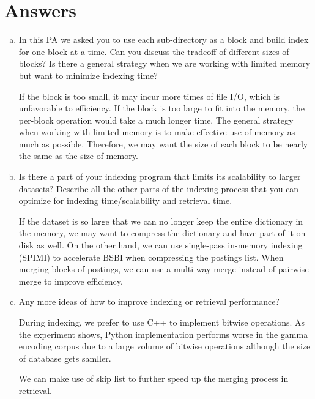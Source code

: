 \section{Answers}

\begin{enumerate}[(a)]
\item
In this PA we asked you to use each sub-directory as a block and build index
for one block at a time. Can you discuss the tradeoff of different sizes of
blocks? Is there a general strategy when we are working with limited memory
but want to minimize indexing time?

If the block is too small, it may incur more times of file I/O, which is unfavorable
 to efficiency. If the block is too large to fit into the memory, the per-block operation would take a much longer time. The general strategy when working with limited memory is to make effective use of memory as much as possible. Therefore, we may want the size of each block to be nearly the same as the size of memory.

\item Is there a part of your indexing program that limits its scalability to larger
datasets? Describe all the other parts of the indexing process that you can
optimize for indexing time/scalability and retrieval time.

If the dataset is so large that we can no longer keep the entire dictionary in the memory,
we may want to compress the dictionary and have part of it on disk as well. On the other hand, we can use single-pass in-memory indexing (SPIMI) to accelerate BSBI when compressing the postings list.
When merging blocks of postings, we can use a multi-way merge instead of pairwise merge to improve efficiency.

\item
Any more ideas of how to improve indexing or retrieval performance?

During indexing, we prefer to use C++ to implement bitwise operations. As the experiment shows, Python implementation performs worse in the gamma encoding corpus due to a large volume of bitwise operations although the size of database gets samller. 

We can make use of skip list to further speed up the merging process in retrieval.
\end{enumerate}





